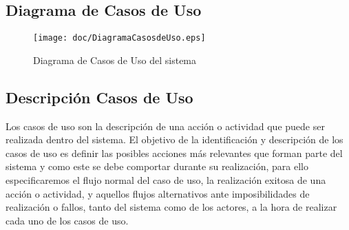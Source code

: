 \subsection{Diagrama de Casos de Uso}
\begin{figure}[H]
\centering
\texttt{[image: doc/DiagramaCasosdeUso.eps]}
\caption{Diagrama de Casos de Uso del sistema}\label{fig:diagrama_casos_de_uso}
\end{figure}

\subsection{Descripción Casos de Uso}
Los casos de uso son la descripción de una acción o actividad que puede ser realizada dentro del sistema. El objetivo de la identificación y descripción de los casos de uso es definir las posibles acciones más relevantes que forman parte del sistema y como este se debe comportar durante su realización, para ello especificaremos el flujo normal del caso de uso, la realización exitosa de una acción o actividad, y aquellos flujos alternativos ante imposibilidades de realización o fallos, tanto del sistema como de los actores, a la hora de realizar cada uno de los casos de uso.

